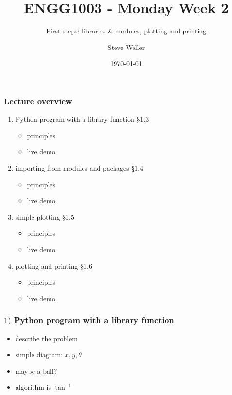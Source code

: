 \documentclass[14pt]{beamer}
\title{ENGG1003 - Monday Week 2}
\subtitle{First steps: libraries \& modules, plotting and printing}
\author{Steve Weller}
\institute{University of Newcastle}
\date{\today}
\newcommand\red[1]{{\color{red} #1}}
\begin{document}
\titlepage


\begin{frame}[fragile]
\frametitle{Lecture overview}
\begin{enumerate}
\item Python program with a library function \red{\S1.3}
	\begin{itemize}
		\item principles
		\item live demo
	\end{itemize}
\item importing from modules and packages \red{\S1.4}
		\begin{itemize}
		\item principles
		\item live demo
	\end{itemize}
	
\item simple plotting \red{\S1.5} 
	\begin{itemize}
			\item principles
		\item live demo
	\end{itemize}
	
\item plotting and printing \red{\S1.6}
	\begin{itemize}
	\item principles
	\item live demo
	\end{itemize}
\end{enumerate}

\end{frame}


\begin{frame}[fragile]
\frametitle{$1)$ Python program with a library function}
\begin{itemize}
\item describe the problem
\item simple diagram: $x, y, \theta$
\item maybe a ball?
\item algorithm is $\tan^{-1}$
\end{itemize}
\end{frame}
\end{document}
